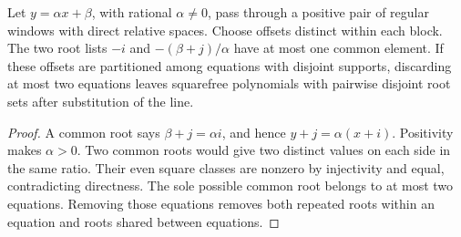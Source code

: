 \begin{lemma}
\label{p1:offset:root-separation}
Let $y=\alpha x+\beta$, with rational $\alpha\ne0$, pass through
a positive pair of regular windows with direct relative spaces.
Choose offsets distinct within each block. The two root lists
$-i$ and $-(\beta+j)/\alpha$ have at most one common element.
If these offsets are partitioned among equations with disjoint supports,
discarding at most two equations leaves squarefree polynomials with
pairwise disjoint root sets after substitution of the line.
\end{lemma}
\begin{proof}
A common root says $\beta+j=\alpha i$, and hence
$y+j=\alpha(x+i)$. Positivity makes $\alpha>0$.
Two common roots would give two distinct values on each side in the
same ratio. Their even square classes are nonzero by injectivity and
equal, contradicting directness. The sole possible common root belongs
to at most two equations. Removing those equations removes both
repeated roots within an equation and roots shared between equations.
\end{proof}

